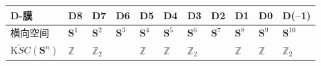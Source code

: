 \documentclass[11pt,a4paper]{ctexart}
\begin{document}
{\def\LTcaptype{table} %
\begin{longtable}[]{@{}
  >{\raggedright\arraybackslash}p{}
  >{\raggedright\arraybackslash}p{}
  >{\raggedright\arraybackslash}p{}
  >{\raggedright\arraybackslash}p{}
  >{\raggedright\arraybackslash}p{}
  >{\raggedright\arraybackslash}p{}
  >{\raggedright\arraybackslash}p{}
  >{\raggedright\arraybackslash}p{}
  >{\raggedright\arraybackslash}p{}
  >{\raggedright\arraybackslash}p{}
  >{\raggedright\arraybackslash}p{}@{}}
\toprule\noalign{}
\begin{minipage}[b]{\linewidth}\raggedright
D-膜
\end{minipage} & \begin{minipage}[b]{\linewidth}\raggedright
D8
\end{minipage} & \begin{minipage}[b]{\linewidth}\raggedright
D7
\end{minipage} & \begin{minipage}[b]{\linewidth}\raggedright
D6
\end{minipage} & \begin{minipage}[b]{\linewidth}\raggedright
D5
\end{minipage} & \begin{minipage}[b]{\linewidth}\raggedright
D4
\end{minipage} & \begin{minipage}[b]{\linewidth}\raggedright
D3
\end{minipage} & \begin{minipage}[b]{\linewidth}\raggedright
D2
\end{minipage} & \begin{minipage}[b]{\linewidth}\raggedright
D1
\end{minipage} & \begin{minipage}[b]{\linewidth}\raggedright
D0
\end{minipage} & \begin{minipage}[b]{\linewidth}\raggedright
D(--1)
\end{minipage} \\
\midrule\noalign{}
\endhead
\bottomrule\noalign{}
\endlastfoot
横向空间 & \({\mathbf S}^1\) & \({\mathbf S}^2\) & \({\mathbf S}^3\) & \({\mathbf S}^4\) & \({\mathbf S}^5\) & \({\mathbf S}^6\) & \({\mathbf S}^7\) & \({\mathbf S}^8\) & \({\mathbf S}^9\) & \({\mathbf S}^{10}\) \\
\(\widetilde{{\mathrm KSC}}({\mathbf S}^n)\) & \({\mathbb{Z}}\) & \({\mathbb{Z}}_2\) & 0 & \({\mathbb{Z}}\) & \({\mathbb{Z}}\) & \({\mathbb{Z}}_2\) & 0 & \({\mathbb{Z}}\) & \({\mathbb{Z}}\) & \({\mathbb{Z}}_2\) \\
\end{longtable}
}
\end{document}

